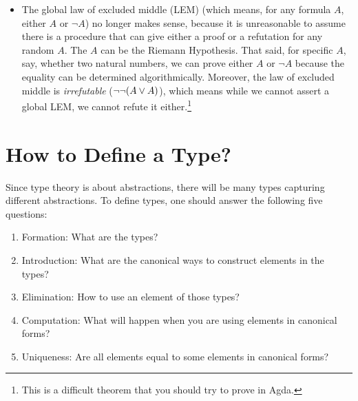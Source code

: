 \documentclass{article}
\begin{document}
\begin{enumerate}
\begin{itemize}
      \item The global law of excluded middle (LEM) (which means, for any formula $A$, either $A$ or $\neg A$) no longer makes sense, because it is unreasonable to assume there is a procedure that can give either a proof or a refutation for any random $A$. The $A$ can be the Riemann Hypothesis. That said, for specific $A$, say, whether two natural numbers, we can prove either $A$ or $\neg A$ because the equality can be determined algorithmically. Moreover, the law of excluded middle is \emph{irrefutable} ($\neg \neg (A \vee A)$), which means while we cannot assert a global LEM, we cannot refute it either.\footnote{This is a difficult theorem that you should try to prove in Agda.}
    \end{itemize}
\end{enumerate}

\section{How to Define a Type?}

Since type theory is about abstractions, there will be many types capturing different abstractions. To define types, one should answer the following five questions:

\begin{enumerate}
  \item Formation: What are the types?
  \item Introduction: What are the canonical ways to construct elements in the types?
  \item Elimination: How to use an element of those types?
  \item Computation: What will happen when you are using elements in canonical forms?
  \item Uniqueness: Are all elements equal to some elements in canonical forms?
\end{enumerate}
\end{document}
